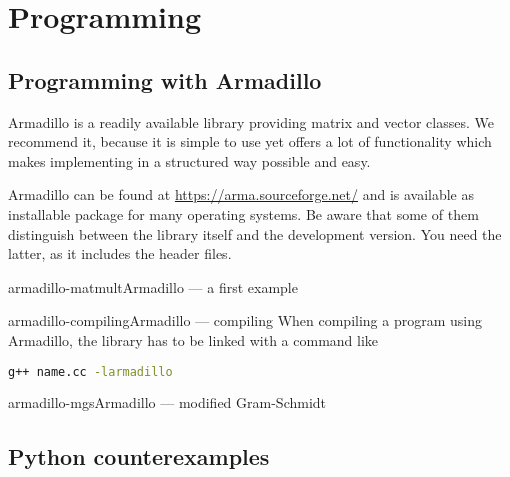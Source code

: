 \chapter{Programming}
\section{Programming with Armadillo}

Armadillo is a readily available library providing matrix and vector
classes. We recommend it, because it is simple to use yet offers a lot
of functionality which makes implementing in a structured way possible
and easy.

Armadillo can be found at \url{https://arma.sourceforge.net/} and is
available as installable package for many operating systems. Be aware
that some of them distinguish between the library itself and the
development version. You need the latter, as it includes the header
files.

\begin{Example*}{armadillo-matmult}{Armadillo --- a first example}
  
\end{Example*}

\begin{Example*}{armadillo-compiling}{Armadillo --- compiling}
  When compiling a program using Armadillo, the library has to be
  linked with a command like
  \begin{lstlisting}[language=bash]
    g++ name.cc -larmadillo
  \end{lstlisting}
\end{Example*}

\begin{Example*}{armadillo-mgs}{Armadillo --- modified Gram-Schmidt}
    
\end{Example*}

\section{Python counterexamples}


